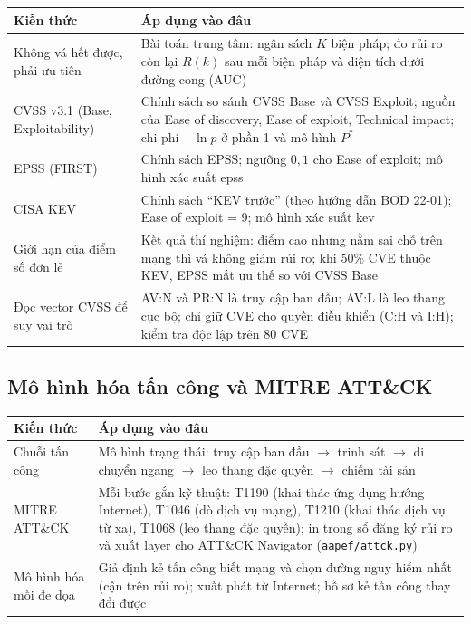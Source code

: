 \documentclass[11pt,a4paper]{article}
\begin{document}
\begin{center}
\small
\begin{tabular}{@{}Y{3.6cm}Y{12.4cm}@{}}
\toprule
\textbf{Kiến thức} & \textbf{Áp dụng vào đâu} \\
\midrule
Không vá hết được, phải ưu tiên & Bài toán trung tâm: ngân sách $K$ biện pháp; đo rủi ro còn lại $R(k)$ sau mỗi biện pháp và diện tích dưới đường cong (AUC) \\
CVSS v3.1 (Base, Exploitability) & Chính sách so sánh CVSS Base và CVSS Exploit; nguồn của Ease of discovery, Ease of exploit, Technical impact; chi phí $-\ln p$ ở phần 1 và mô hình $P^{*}$ \\
EPSS (FIRST) & Chính sách EPSS; ngưỡng $0{,}1$ cho Ease of exploit; mô hình xác suất epss \\
CISA KEV & Chính sách ``KEV trước'' (theo hướng dẫn BOD 22-01); Ease of exploit = 9; mô hình xác suất kev \\
Giới hạn của điểm số đơn lẻ & Kết quả thí nghiệm: điểm cao nhưng nằm sai chỗ trên mạng thì vá không giảm rủi ro; khi 50\% CVE thuộc KEV, EPSS mất ưu thế so với CVSS Base \\
Đọc vector CVSS để suy vai trò & AV:N và PR:N là truy cập ban đầu; AV:L là leo thang cục bộ; chỉ giữ CVE cho quyền điều khiển (C:H và I:H); kiểm tra độc lập trên 80 CVE \\
\bottomrule
\end{tabular}
\end{center}

\subsection{Mô hình hóa tấn công và MITRE ATT\&CK}

\begin{center}
\small
\begin{tabular}{@{}Y{3.6cm}Y{12.4cm}@{}}
\toprule
\textbf{Kiến thức} & \textbf{Áp dụng vào đâu} \\
\midrule
Chuỗi tấn công & Mô hình trạng thái: truy cập ban đầu $\to$ trinh sát $\to$ di chuyển ngang $\to$ leo thang đặc quyền $\to$ chiếm tài sản \\
MITRE ATT\&CK & Mỗi bước gắn kỹ thuật: T1190 (khai thác ứng dụng hướng Internet), T1046 (dò dịch vụ mạng), T1210 (khai thác dịch vụ từ xa), T1068 (leo thang đặc quyền); in trong sổ đăng ký rủi ro và xuất layer cho ATT\&CK Navigator (\texttt{aapef/attck.py}) \\
Mô hình hóa mối đe dọa & Giả định kẻ tấn công biết mạng và chọn đường nguy hiểm nhất (cận trên rủi ro); xuất phát từ Internet; hồ sơ kẻ tấn công thay đổi được \\
\bottomrule
\end{tabular}
\end{center}
\end{document}
